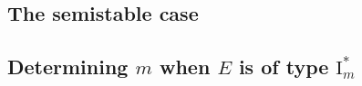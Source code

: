 \subsection{The semistable case} \label{sec:the_semistable_case}


\subsection{Determining $m$ when $E$ is of type $\mathrm I_m^*$} \label{sec:determining_m_when_e_is_of_type_ims$}




